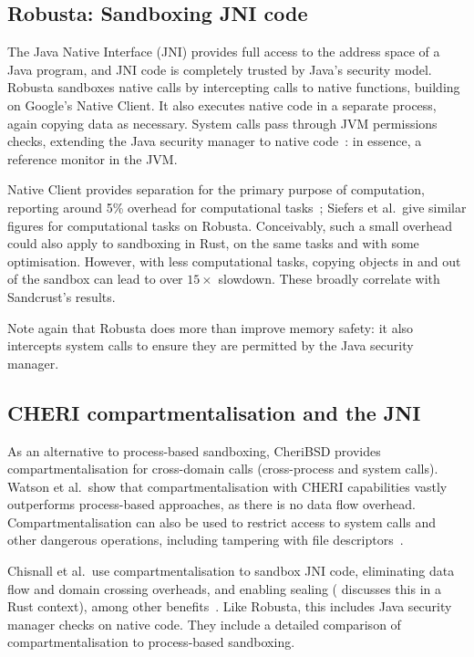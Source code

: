 \documentclass[dissertation.tex]{subfiles}
\begin{document}
\subsection{Robusta: Sandboxing JNI code}
The Java Native Interface (JNI) provides full access to the address
space of a Java program, and JNI code is completely trusted by Java's
security model.
Robusta sandboxes native calls by intercepting calls to native
functions, building on Google's Native Client.
It also executes native code in a separate process, again copying data
as necessary.
System calls pass through JVM permissions checks, extending the Java
security manager to native code~\cite{siefers-robusta}: in essence, a
reference monitor in the JVM.

Native Client provides separation for the primary purpose of
computation, reporting around 5\% overhead for computational
tasks~\cite{yee-nacl}; Siefers et al.\ give similar figures for
computational tasks on Robusta.
Conceivably, such a small overhead could also apply to sandboxing in
Rust, on the same tasks and with some optimisation.
However, with less computational tasks, copying objects in and out of
the sandbox can lead to over \(15\times\) slowdown.
These broadly correlate with Sandcrust's results.

Note again that Robusta does more than improve memory safety: it also
intercepts system calls to ensure they are permitted by the Java
security manager.


\subsection{CHERI compartmentalisation and the JNI}
\label{sec:rel-cheri-jni}

As an alternative to process-based sandboxing, CheriBSD provides
compartmentalisation for cross-domain calls (cross-process and system
calls).
Watson et al.\ show that compartmentalisation with CHERI capabilities
vastly outperforms process-based approaches, as there is no data flow
overhead.
Compartmentalisation can also be used to restrict access to system
calls and other dangerous operations, including tampering with file
descriptors~\cite{cheri2015}.

Chisnall et al.\ use compartmentalisation to sandbox JNI code, eliminating
data flow and domain crossing overheads, and enabling sealing
( discusses this in a Rust context), among
other benefits~\cite{cheri-jni}.
Like Robusta, this includes Java security manager checks on native code.
They include a detailed comparison of compartmentalisation to
process-based sandboxing.
\end{document}

